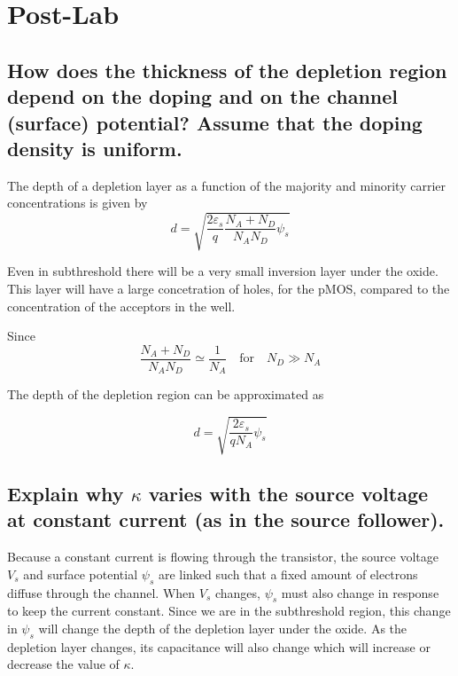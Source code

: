 


\newpage
\section{Post-Lab}
\subsection{How does the thickness of the depletion region depend on the doping and on the
channel (surface) potential? Assume that the doping density is uniform.}

The depth of a depletion layer as a function of the majority and minority carrier concentrations
is given by 
\begin{equation*}
    d = \sqrt{\frac{2\varepsilon_s}{q}\frac{N_A+N_D}{N_AN_D}\psi_s}
\end{equation*}

Even in subthreshold there will be a very small inversion layer under the oxide. This layer will have
a large concetration of holes, for the pMOS, compared to the concentration of the acceptors in the well.

Since
\begin{equation*}
    \frac{N_A+N_D}{N_AN_D} \simeq \frac{1}{N_A} \quad \text{for} \quad N_D \gg N_A
\end{equation*}

The depth of the depletion region can be approximated as

\begin{equation*}
    d = \sqrt{\frac{2\varepsilon_s}{qN_A}\psi_s}
\end{equation*}

\subsection{ Explain why \(\kappa\) varies with the source voltage at constant current (as in the source
follower).}

Because a constant current is flowing through the transistor, the source voltage \(V_s\) and surface potential
\(\psi_s\) are linked such that a fixed amount of electrons diffuse through the channel. When \(V_s\) changes, \(\psi_s\)
must also change in response to keep the current constant. Since we are in the subthreshold region, this change in 
\(\psi_s\) will change the depth of the depletion layer under the oxide. As the depletion layer changes, its capacitance
will also change which will increase or decrease the value of \(\kappa\).

